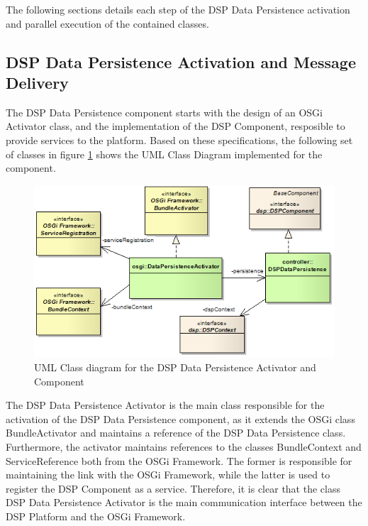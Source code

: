 The following sections details each step of the DSP Data Persistence activation
and parallel execution of the contained classes.

\subsection{DSP Data Persistence Activation and Message Delivery}

The DSP Data Persistence component starts with the design of an OSGi Activator
class, and the implementation of the DSP Component, resposible to provide
services to the platform. Based on these specifications, the following set of
classes in figure \ref{fig:DSP-DataPersistence-Activator-Class-Diagram} shows
the UML Class Diagram \cite{uml} implemented for the component.

\begin{figure}[!h]
  \centering
  \includegraphics[scale=0.5]{../diagrams/DSP-DataPersistence-Activator-Class-Diagram}
  \caption{UML Class diagram for the DSP Data Persistence Activator and Component}
  \label{fig:DSP-DataPersistence-Activator-Class-Diagram}
\end{figure}

The DSP Data Persistence Activator is the main class responsible for the
activation of the DSP Data Persistence component, as it extends the OSGi class
BundleActivator and maintains a reference of the DSP Data Persistence class.
Furthermore, the activator maintains references to the classes BundleContext
and ServiceReference both from the OSGi Framework. The former is responsible
for maintaining the link with the OSGi Framework, while the latter is used to
register the DSP Component as a service. Therefore, it is clear that the class
DSP Data Persistence Activator is the main communication interface between the
DSP Platform and the OSGi Framework.

